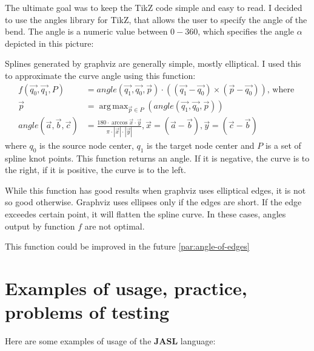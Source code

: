 \documentclass{ctuthesis}
\DeclareMathOperator*{\argmax}{arg\,max}
\begin{document}
The ultimate goal was to keep the TikZ code simple and easy to read. I decided to use the angles library for TikZ, that allows the user to specify the angle of the bend. The angle is a numeric value between $0-360$, which specifies the angle $\alpha$ depicted in this picture:

\begin{figure}[H]
\end{figure}

Splines generated by graphviz are generally simple, mostly elliptical. I used this to approximate the curve angle using this function:
\begin{align*}
	f(\vec{q_0}, \vec{q_1}, P) &= angle(\vec{q_1}, \vec{q_0}, \vec{p}) \cdot ((\vec{q_1} - \vec{q_0})\times (\vec{p} - \vec{q_0})) \text{, where } \\
	\vec{p} &= \argmax_{\vec{p} \in P} (angle(\vec{q_1}, \vec{q_0}, \vec{p})) \\
	angle(\vec{a}, \vec{b}, \vec{c}) &= \frac{
		180 \cdot \arccos{ \vec{x} \cdot \vec{y} }}{ \pi \cdot |\vec{x}| \cdot |\vec{y}| }, \vec{x} = (\vec{a} - \vec{b}), \vec{y} = (\vec{c}-\vec{b})
\end{align*}
where $q_0$ is the source node center, $q_1$ is the target node center and $P$ is a set of spline knot points. This function returns an angle. If it is negative, the curve is to the right, if it is positive, the curve is to the left. 

While this function has good results when graphviz uses elliptical edges, it is not so good otherwise. Graphviz uses ellipses only if the edges are short. If the edge exceedes certain point, it will flatten the spline curve. In these cases, angles output by function $f$ are not optimal. 

This function could be improved in the future \ref{par:angle-of-edges}


\chapter{Examples of usage, practice, problems of testing}
Here are some examples of usage of the \textbf{JASL} language: 
\end{document}

